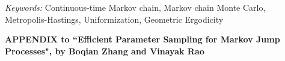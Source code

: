 \documentclass[12pt]{article}
\begin{document}
\noindent%
{\it Keywords:}  Continuous-time Markov chain, Markov chain Monte Carlo, 
Metropolis-Hastings, Uniformization, Geometric Ergodicity 
\vfill

\newpage
{} %


 
 
 
 
 
 
 

%



\newpage
\bigskip
\begin{center}
{\large\bf APPENDIX to ``Efficient Parameter Sampling for Markov
Jump Processes", by Boqian Zhang and Vinayak Rao}
\end{center}



\end{document}
